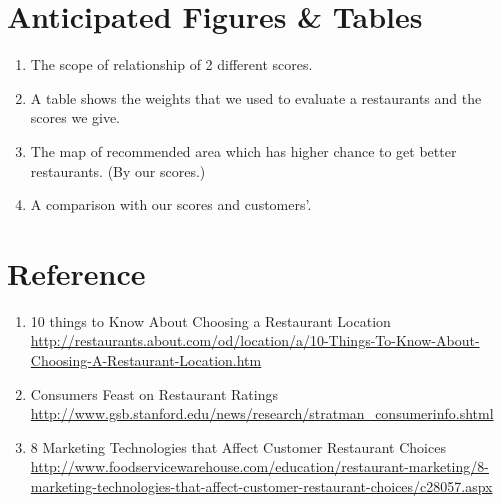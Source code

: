 \documentclass{article}
\begin{document}
\section{Anticipated Figures \& Tables}
\begin{enumerate}
  \item The scope of relationship of 2 different scores.
  \item A table shows the weights that we used to evaluate a restaurants and the scores we give.
   \item The map of recommended area which has higher chance to get better restaurants. (By our scores.)
  \item A comparison with our scores and customers'. 
\end{enumerate}



\section{Reference}
\begin{enumerate}
  \item10 things to Know About Choosing a Restaurant Location \url{http://restaurants.about.com/od/location/a/10-Things-To-Know-About-Choosing-A-Restaurant-Location.htm}
  \item Consumers Feast on Restaurant Ratings \url{http://www.gsb.stanford.edu/news/research/stratman_consumerinfo.shtml}
  \item 8 Marketing Technologies that Affect Customer Restaurant Choices \url{http://www.foodservicewarehouse.com/education/restaurant-marketing/8-marketing-technologies-that-affect-customer-restaurant-choices/c28057.aspx}
\end{enumerate}
\end{document}
